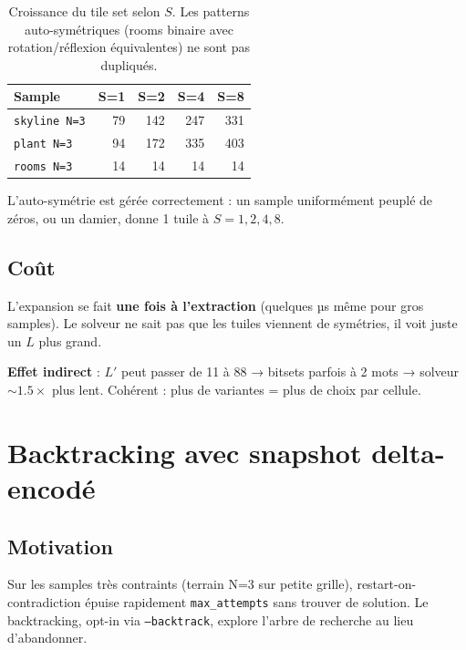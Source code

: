 \begin{table}[H]
\centering
\begin{tabular}{lrrrr}
\toprule
\textbf{Sample} & \textbf{S=1} & \textbf{S=2} & \textbf{S=4} & \textbf{S=8} \\
\midrule
\texttt{skyline N=3} & 79 & 142 & 247 & 331 \\
\texttt{plant N=3} & 94 & 172 & 335 & 403 \\
\texttt{rooms N=3} & 14 & 14 & 14 & 14 \\
\bottomrule
\end{tabular}
\caption{Croissance du tile set selon $S$. Les patterns auto-symétriques (rooms binaire avec rotation/réflexion équivalentes) ne sont pas dupliqués.}
\label{tab:ext:tile_count}
\end{table}

L'auto-symétrie est gérée correctement : un sample uniformément peuplé de zéros, ou un damier, donne 1 tuile à $S = 1, 2, 4, 8$.

\subsection{Coût}

L'expansion se fait \textbf{une fois à l'extraction} (quelques µs même pour gros samples). Le solveur ne sait pas que les tuiles viennent de symétries, il voit juste un $L$ plus grand.

\textbf{Effet indirect} : $L'$ peut passer de 11 à 88 → bitsets parfois à 2 mots → solveur $\sim 1.5\times$ plus lent. Cohérent : plus de variantes = plus de choix par cellule.

\section{Backtracking avec snapshot delta-encodé}
\label{sec:ext:backtracking}

\subsection{Motivation}

Sur les samples très contraints (terrain N=3 sur petite grille), restart-on-contradiction épuise rapidement \texttt{max\_attempts} sans trouver de solution. Le backtracking, opt-in via \texttt{--backtrack}, explore l'arbre de recherche au lieu d'abandonner.

